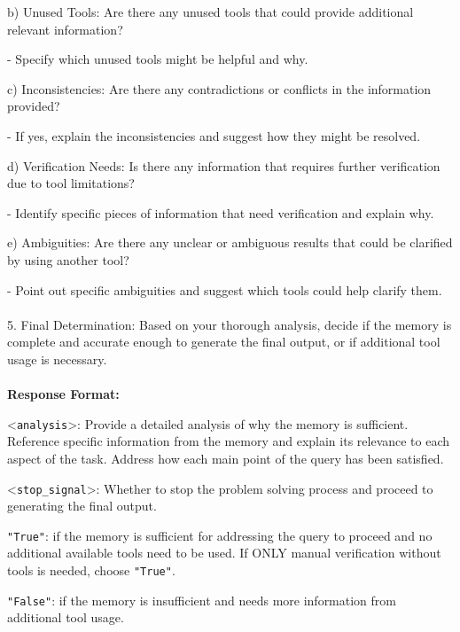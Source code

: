 \begin{textcolorbox}
\quad b) Unused Tools: Are there any unused tools that could provide additional relevant information?

\quad\quad - Specify which unused tools might be helpful and why.

\quad c) Inconsistencies: Are there any contradictions or conflicts in the information provided?

\quad\quad - If yes, explain the inconsistencies and suggest how they might be resolved.

\quad d) Verification Needs: Is there any information that requires further verification due to tool limitations?

\quad\quad - Identify specific pieces of information that need verification and explain why.

\quad e) Ambiguities: Are there any unclear or ambiguous results that could be clarified by using another tool?

\quad\quad - Point out specific ambiguities and suggest which tools could help clarify them.
\\\\
5. Final Determination:
   Based on your thorough analysis, decide if the memory is complete and accurate enough to generate the final output, or if additional tool usage is necessary.
\\\\
\textbf{Response Format:}

\textless{}\texttt{analysis}\textgreater{}: Provide a detailed analysis of why the memory is sufficient. Reference specific information from the memory and explain its relevance to each aspect of the task. Address how each main point of the query has been satisfied.

\textless{}\texttt{stop\_signal}\textgreater{}: Whether to stop the problem solving process and proceed to generating the final output.

\quad * \texttt{"True"}: if the memory is sufficient for addressing the query to proceed and no additional available tools need to be used. If ONLY manual verification without tools is needed, choose \texttt{"True"}.

\quad * \texttt{"False"}: if the memory is insufficient and needs more information from additional tool usage.
\end{textcolorbox}